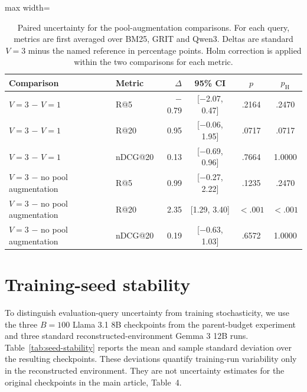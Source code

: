 \documentclass[pdflatex,sn-basic,Numbered]{sn-jnl}%
\theoremstyle{thmstyleone}%
\theoremstyle{thmstyletwo}%
\theoremstyle{thmstylethree}%
\begin{document}
\begin{table}[t]


\centering
\scriptsize
\setlength{\tabcolsep}{4pt}
\renewcommand{\arraystretch}{1.0}
\begin{adjustbox}{max width=\linewidth}
\begin{tabular}{l l r c c c}
\hline
Comparison & Metric & $\Delta$ & 95\% CI & $p$ & $p_{\mathrm{H}}$ \\
\hline
$V=3$ $-$ $V=1$ & R@5 & $-$0.79 & [$-$2.07, 0.47] & .2164 & .2470 \\
$V=3$ $-$ $V=1$ & R@20 & 0.95 & [$-$0.06, 1.95] & .0717 & .0717 \\
$V=3$ $-$ $V=1$ & nDCG@20 & 0.13 & [$-$0.69, 0.96] & .7664 & 1.0000 \\
$V=3$ $-$ no pool augmentation & R@5 & 0.99 & [$-$0.27, 2.22] & .1235 & .2470 \\
$V=3$ $-$ no pool augmentation & R@20 & 2.35 & [1.29, 3.40] & $<.001$ & $<.001$ \\
$V=3$ $-$ no pool augmentation & nDCG@20 & 0.19 & [$-$0.63, 1.03] & .6572 & 1.0000 \\
\hline
\end{tabular}
\end{adjustbox}


\caption{Paired uncertainty for the pool-augmentation comparisons. For each
query, metrics are first averaged over BM25, GRIT and Qwen3. Deltas are standard
$V=3$ minus the named reference in percentage points. Holm correction is applied
within the two comparisons for each metric.}
\label{tab:pool-augmentation-uncertainty}
\end{table}

\FloatBarrier
\section{Training-seed stability}
\label{supp:seeds}

To distinguish evaluation-query uncertainty from training stochasticity, we use
the three $B=100$ Llama 3.1 8B checkpoints from the parent-budget experiment
and three standard reconstructed-environment Gemma 3 12B runs.
Table~\ref{tab:seed-stability} reports the mean and sample standard deviation
over the resulting checkpoints. These deviations quantify training-run
variability only in the reconstructed environment. They are not uncertainty
estimates for the original checkpoints in the main article, Table~4.
\end{document}
